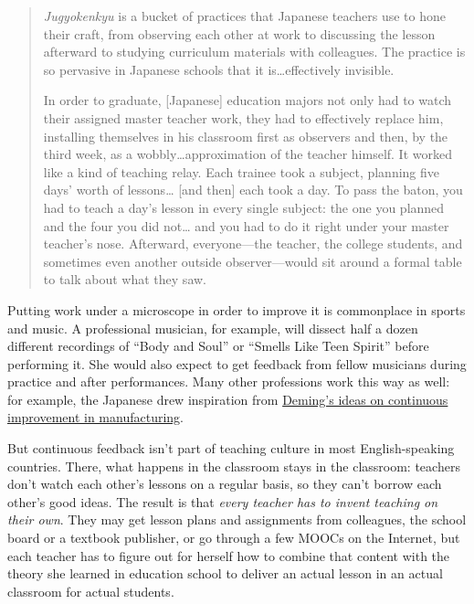 \begin{quote}

\emph{Jugyokenkyu} is a bucket of practices that Japanese teachers use to
hone their craft, from observing each other at work to discussing the
lesson afterward to studying curriculum materials with colleagues. The
practice is so pervasive in Japanese schools that it
is\ldots{}effectively invisible.

In order to graduate, {[}Japanese{]} education majors not only had to
watch their assigned master teacher work, they had to effectively
replace him, installing themselves in his classroom first as
observers and then, by the third week, as a wobbly\ldots{}approximation
of the teacher himself. It worked like a kind of teaching
relay. Each trainee took a subject, planning five days' worth of
lessons\ldots{} {[}and then{]} each took a day. To pass the baton, you had to
teach a day's lesson in every single subject: the one you planned
and the four you did not\ldots{} and you had to do it right under your
master teacher's nose. Afterward, everyone---the teacher, the
college students, and sometimes even another outside
observer---would sit around a formal table to talk about what they
saw.

\end{quote}

Putting work under a microscope in order to improve it is commonplace
in sports and music. A professional musician, for example, will
dissect half a dozen different recordings of ``Body and Soul'' or
``Smells Like Teen Spirit'' before performing it. She would also expect
to get feedback from fellow musicians during practice and after
performances. Many other professions work this way as well: for
example, the Japanese drew inspiration from \href{https://en.wikipedia.org/wiki/W.\_Edwards\_Deming}{Deming's ideas on
continuous improvement in manufacturing}.

But continuous feedback isn't part of teaching culture in most
English-speaking countries. There, what happens in the classroom stays
in the classroom: teachers don't watch each other's lessons on a
regular basis, so they can't borrow each other's good ideas. The
result is that \emph{every teacher has to invent teaching on their
own}. They may get lesson plans and assignments from colleagues, the
school board or a textbook publisher, or go through a few MOOCs on the
Internet, but each teacher has to figure out for herself how to
combine that content with the theory she learned in education school
to deliver an actual lesson in an actual classroom for actual
students.

